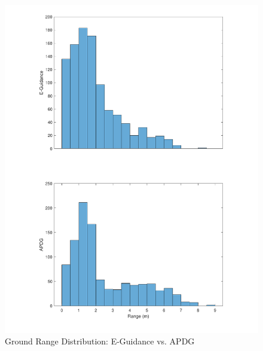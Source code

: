\begin{figure}[H]
	\centering
	\begin{minipage}{4.3 in}
		\includegraphics[width=\linewidth]{Figures/hrngEvsAPDG.pdf}
		\caption{Ground Range Distribution: E-Guidance vs. APDG \label{fig:hrngEvsAPDG} }
	\end{minipage}
\end{figure}



